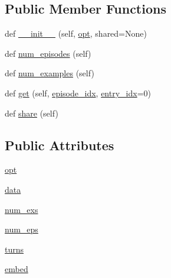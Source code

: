 \subsection*{Public Member Functions}
\begin{DoxyCompactItemize}
\item 
def \hyperlink{classparlai_1_1tasks_1_1empathetic__dialogues_1_1agents_1_1EmpatheticDialogueTeacher_ac347d9d7190c35bcf93f756a54cf0c94}{\+\_\+\+\_\+init\+\_\+\+\_\+} (self, \hyperlink{classparlai_1_1tasks_1_1empathetic__dialogues_1_1agents_1_1EmpatheticDialogueTeacher_a5f7a6df7d74bac8fce918c8216db33f9}{opt}, shared=None)
\item 
def \hyperlink{classparlai_1_1tasks_1_1empathetic__dialogues_1_1agents_1_1EmpatheticDialogueTeacher_a6859c7bc8c2c58f1c2ac23d7eb804eb7}{num\+\_\+episodes} (self)
\item 
def \hyperlink{classparlai_1_1tasks_1_1empathetic__dialogues_1_1agents_1_1EmpatheticDialogueTeacher_ab6f8d6b5343bd3e535c02d64c194414e}{num\+\_\+examples} (self)
\item 
def \hyperlink{classparlai_1_1tasks_1_1empathetic__dialogues_1_1agents_1_1EmpatheticDialogueTeacher_aabbb16fc89a8537631c13b3569efd223}{get} (self, \hyperlink{classparlai_1_1core_1_1teachers_1_1FixedDialogTeacher_afd4ebab8063eb42d182d30a1a41f133e}{episode\+\_\+idx}, \hyperlink{classparlai_1_1core_1_1teachers_1_1FixedDialogTeacher_ae3201b15f3c3b46a2f3511bad9b43e7d}{entry\+\_\+idx}=0)
\item 
def \hyperlink{classparlai_1_1tasks_1_1empathetic__dialogues_1_1agents_1_1EmpatheticDialogueTeacher_ad98fc90e215e507730a5e91c52f6378c}{share} (self)
\end{DoxyCompactItemize}
\subsection*{Public Attributes}
\begin{DoxyCompactItemize}
\item 
\hyperlink{classparlai_1_1tasks_1_1empathetic__dialogues_1_1agents_1_1EmpatheticDialogueTeacher_a5f7a6df7d74bac8fce918c8216db33f9}{opt}
\item 
\hyperlink{classparlai_1_1tasks_1_1empathetic__dialogues_1_1agents_1_1EmpatheticDialogueTeacher_a2786691da034d35bbece29b2d16f280e}{data}
\item 
\hyperlink{classparlai_1_1tasks_1_1empathetic__dialogues_1_1agents_1_1EmpatheticDialogueTeacher_ab02581b56d9b8ed536a9e662f3cbc8e6}{num\+\_\+exs}
\item 
\hyperlink{classparlai_1_1tasks_1_1empathetic__dialogues_1_1agents_1_1EmpatheticDialogueTeacher_a89a75ce245cc3b3842ee0a71dcdb2d2e}{num\+\_\+eps}
\item 
\hyperlink{classparlai_1_1tasks_1_1empathetic__dialogues_1_1agents_1_1EmpatheticDialogueTeacher_ae0b4395b2dc54e9ad53da864518f4dfd}{turns}
\item 
\hyperlink{classparlai_1_1tasks_1_1empathetic__dialogues_1_1agents_1_1EmpatheticDialogueTeacher_a59bd8156f297d2449d05536456151539}{embed}
\end{DoxyCompactItemize}
